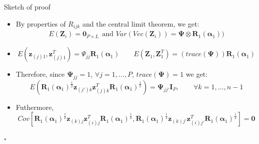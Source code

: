 \documentclass[t,9pt]{beamer}
\begin{document}
\begin{frame}[fragile]{Sketch of proof}
\begin{itemize}
    \item[6.] By properties of $R_{ijk}$ and the central limit theorem, we get:
    \begin{align}\nonumber
    E(\pmb{Z}_i) =\pmb{0}_{P\times L} \, \; \text{and }
    Var(Vec(\pmb{Z}_i))=\pmb{ \Psi} \otimes \pmb{R}_1(\pmb{\alpha}_1))
\end{align}
\item[7.]
\begin{equation}\nonumber
    E(\pmb{z}_{(j)1}, \pmb{z}^T_{(j)1})=\Psi_{jj}\pmb{R}_1(\pmb{\alpha}_1) \qquad E(\pmb{Z}_1, \pmb{Z}^T_1)=(trace(\pmb{\Psi}))\pmb{R}_1(\pmb{\alpha}_1)\nonumber
\end{equation}
\item[8.] Therefore, since $\pmb{\Psi}_{jj}=1$, $\forall j=1,\ldots, P$, $trace(\pmb{\Psi})=1$ we get:
\begin{equation}\nonumber
   E\left( \pmb{R}_1(\pmb{\alpha}_1)^{\frac{1}{2}}\pmb{z}_{(j')k} \pmb{z}^T_{(j)k} \pmb{R}_1(\pmb{\alpha}_1)^{\frac{1}{2}}\right)=\pmb{\Psi}_{jj'}\pmb{I}_P, \qquad \forall k=1, \ldots, n-1
\end{equation}
\item[9.] Futhermore, 
\begin{equation}\nonumber
    Cov[\pmb{R}_1(\pmb{\alpha}_1)^{\frac{1}{2}} \pmb{z}_{(k)j} \pmb{z}^T_{(i)j} \pmb{R}_1(\pmb{\alpha}_1)^{\frac{1}{2}}, \pmb{R}_1(\pmb{\alpha}_1)^{\frac{1}{2}} \pmb{z}_{(k)j'} \pmb{z}^T_{(i)j'} \pmb{R}_1(\pmb{\alpha}_1)^{\frac{1}{2}} ]=\pmb{0}   
\end{equation}
\end{itemize}
$\square$
\end{frame}
\end{document}
